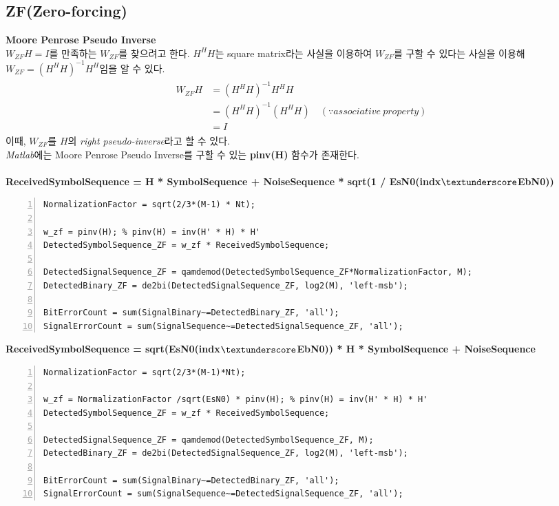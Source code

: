 \documentclass{article}
\newcommand{\bd}{\textbf} %
\begin{document}
\subsection{ZF(Zero-forcing)}
\bd{Moore Penrose Pseudo Inverse}\\
$W_{ZF}H=I$를 만족하는 $W_{ZF}$를 찾으려고 한다. $H^H H$는 square matrix라는 사실을 이용하여 $W_{ZF}$를 구할 수 있다는 사실을 이용해 $W_{ZF}=(H^H H)^{-1}H^H$임을 알 수 있다.
\begin{gather}
	\begin{split}
		W_{ZF}H&=(H^H H)^{-1}H^H H\\
		&=(H^H H)^{-1}(H^H H) \quad (\because associative\ property)\\
		&=I
	\end{split}
\end{gather}
이때, $W_{ZF}$를 $H$의 \textsl{right pseudo-inverse}라고 할 수 있다.\\
\textsl{Matlab}에는 Moore Penrose Pseudo Inverse를 구할 수 있는 \bd{pinv(H)} 함수가 존재한다.\\
\\
\bd{ReceivedSymbolSequence = H * SymbolSequence + NoiseSequence * sqrt(1 / EsN0(indx$\textunderscore$EbN0))}
\begin{lstlisting}[style=Matlab-editor, frame=single, numbers=left,]
NormalizationFactor = sqrt(2/3*(M-1) * Nt);

w_zf = pinv(H); % pinv(H) = inv(H' * H) * H'
DetectedSymbolSequence_ZF = w_zf * ReceivedSymbolSequence;

DetectedSignalSequence_ZF = qamdemod(DetectedSymbolSequence_ZF*NormalizationFactor, M);
DetectedBinary_ZF = de2bi(DetectedSignalSequence_ZF, log2(M), 'left-msb');

BitErrorCount = sum(SignalBinary~=DetectedBinary_ZF, 'all');
SignalErrorCount = sum(SignalSequence~=DetectedSignalSequence_ZF, 'all');
\end{lstlisting}
\newpage
\noindent
\bd{ReceivedSymbolSequence = sqrt(EsN0(indx$\textunderscore$EbN0)) * H * SymbolSequence + NoiseSequence}
\begin{lstlisting}[style=Matlab-editor, frame=single, numbers=left,]
NormalizationFactor = sqrt(2/3*(M-1)*Nt);

w_zf = NormalizationFactor /sqrt(EsN0) * pinv(H); % pinv(H) = inv(H' * H) * H'
DetectedSymbolSequence_ZF = w_zf * ReceivedSymbolSequence;

DetectedSignalSequence_ZF = qamdemod(DetectedSymbolSequence_ZF, M);
DetectedBinary_ZF = de2bi(DetectedSignalSequence_ZF, log2(M), 'left-msb');

BitErrorCount = sum(SignalBinary~=DetectedBinary_ZF, 'all');
SignalErrorCount = sum(SignalSequence~=DetectedSignalSequence_ZF, 'all');
\end{lstlisting}
\end{document}
